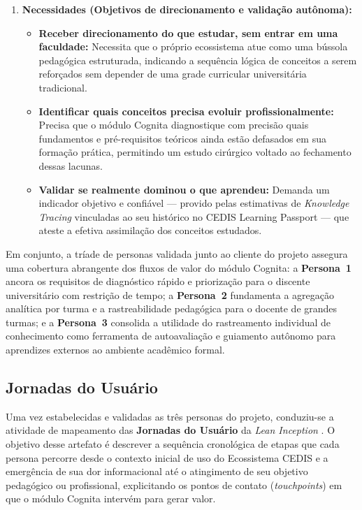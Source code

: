 \begin{enumerate}
    \item \textbf{Necessidades (Objetivos de direcionamento e validação autônoma):}
    \begin{itemize}
        \item \textbf{Receber direcionamento do que estudar, sem entrar em uma faculdade:} Necessita que o próprio ecossistema atue como uma bússola pedagógica estruturada, indicando a sequência lógica de conceitos a serem reforçados sem depender de uma grade curricular universitária tradicional.
        \item \textbf{Identificar quais conceitos precisa evoluir profissionalmente:} Precisa que o módulo Cognita diagnostique com precisão quais fundamentos e pré-requisitos teóricos ainda estão defasados em sua formação prática, permitindo um estudo cirúrgico voltado ao fechamento dessas lacunas.
        \item \textbf{Validar se realmente dominou o que aprendeu:} Demanda um indicador objetivo e confiável — provido pelas estimativas de \textit{Knowledge Tracing} vinculadas ao seu histórico no CEDIS Learning Passport — que ateste a efetiva assimilação dos conceitos estudados.
    \end{itemize}
\end{enumerate}

Em conjunto, a tríade de personas validada junto ao cliente do projeto assegura uma cobertura abrangente dos fluxos de valor do módulo Cognita: a \textbf{Persona~1} ancora os requisitos de diagnóstico rápido e priorização para o discente universitário com restrição de tempo; a \textbf{Persona~2} fundamenta a agregação analítica por turma e a rastreabilidade pedagógica para o docente de grandes turmas; e a \textbf{Persona~3} consolida a utilidade do rastreamento individual de conhecimento como ferramenta de autoavaliação e guiamento autônomo para aprendizes externos ao ambiente acadêmico formal.

\subsection{Jornadas do Usuário}
\label{subsec:jornadas-usuario}

Uma vez estabelecidas e validadas as três personas do projeto, conduziu-se a atividade de mapeamento das \textbf{Jornadas do Usuário} da \textit{Lean Inception} \cite{caroli_lean_2018}. O objetivo desse artefato é descrever a sequência cronológica de etapas que cada persona percorre desde o contexto inicial de uso do Ecossistema CEDIS e a emergência de sua dor informacional até o atingimento de seu objetivo pedagógico ou profissional, explicitando os pontos de contato (\textit{touchpoints}) em que o módulo Cognita intervém para gerar valor.

